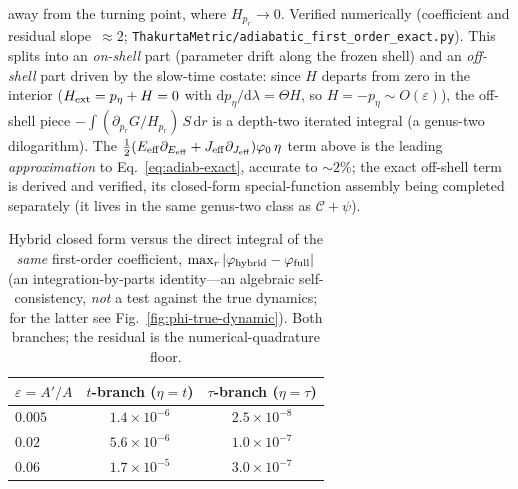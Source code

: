 \documentclass[12pt]{iopart}
\newcommand{\dd}{\mathrm{d}}
\begin{document}
away from the turning point, where $H_{p_r}\to0$. Verified numerically (coefficient
and residual slope~$\approx2$; \texttt{ThakurtaMetric/adiabatic\_first\_order\_exact.py}). This splits into an
\emph{on-shell} part (parameter drift along the frozen shell) and an \emph{off-shell}
part driven by the slow-time costate: since $H$ departs from zero in the interior
($H_{\rm ext}=p_\eta+H=0$ with $\dd p_\eta/\dd\lambda=\Theta H$, so $H=-p_\eta\sim
O(\varepsilon)$), the off-shell piece $-\!\int(\partial_{p_r}G/H_{p_r})\,S\,\dd r$ is a
depth-two iterated integral (a genus-two dilogarithm). The
$\tfrac12(E_{\rm eff}\partial_{E_{\rm eff}}+J_{\rm eff}\partial_{J_{\rm eff}})\varphi_0\,\eta$
term above is the leading
\emph{approximation} to Eq.~\eqref{eq:adiab-exact}, accurate to $\sim2\%$; the exact
off-shell term is derived and verified, its closed-form special-function assembly being
completed separately (it lives in the same genus-two class as $\mathcal{C}+\psi$).
\begin{table}[htbp]
    \centering
    \caption{Hybrid closed form versus the direct integral of the \emph{same}
    first-order coefficient, $\max_r|\varphi_{\rm hybrid}-\varphi_{\rm full}|$ (an
    integration-by-parts identity---an algebraic self-consistency, \emph{not} a test
    against the true dynamics; for the latter see Fig.~\ref{fig:phi-true-dynamic}).
    Both branches; the residual is the numerical-quadrature floor.}
    \label{tab:adiab-valid}
    \begin{tabular}{lcc}
        \hline\hline
        $\varepsilon=A'/A$ & $t$-branch ($\eta=t$) & $\tau$-branch ($\eta=\tau$)\\
        \hline
        $0.005$ & $1.4\times10^{-6}$ & $2.5\times10^{-8}$\\
        $0.02$  & $5.6\times10^{-6}$ & $1.0\times10^{-7}$\\
        $0.06$  & $1.7\times10^{-5}$ & $3.0\times10^{-7}$\\
        \hline\hline
    \end{tabular}
\end{table}
\end{document}
